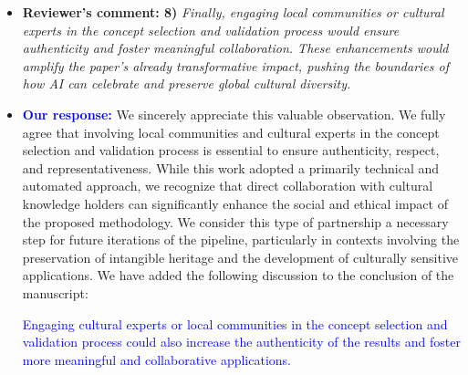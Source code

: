 \documentclass[11pt]{article}
\begin{document}
\begin{itemize}
\item {\bf Reviewer's comment: 8)} {\it
Finally, engaging local communities or cultural experts in the concept selection and validation process would ensure authenticity and foster meaningful collaboration. These enhancements would amplify the paper's already transformative impact, pushing the boundaries of how AI can celebrate and preserve global cultural diversity.
}
\item {\bf \textcolor{blue}{Our response:}} We sincerely appreciate this valuable observation. We fully agree that involving local communities and cultural experts in the concept selection and validation process is essential to ensure authenticity, respect, and representativeness. While this work adopted a primarily technical and automated approach, we recognize that direct collaboration with cultural knowledge holders can significantly enhance the social and ethical impact of the proposed methodology. We consider this type of partnership a necessary step for future iterations of the pipeline, particularly in contexts involving the preservation of intangible heritage and the development of culturally sensitive applications. We have added the following discussion to the conclusion of the manuscript:

\textcolor{blue}{Engaging cultural experts or local communities in the concept selection and validation process could also increase the authenticity of the results and foster more meaningful and collaborative applications.}

\end{itemize}

\newpage
\printbibliography
\end{document}
